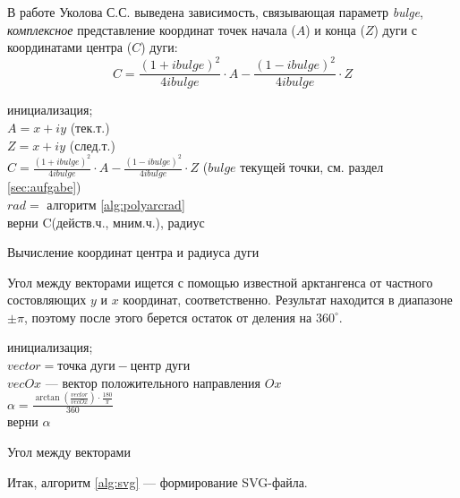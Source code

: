 В работе Уколова С.С. \cite{ukoloff} выведена зависимость, связывающая параметр \textit{bulge},  \textit{комплексное} представление координат точек начала ($A$) и конца ($Z$) дуги с координатами центра ($C$) дуги:
\begin{equation}
	C={\frac{(1+ibulge)^2}{4ibulge}}\cdot A-{\frac{(1-ibulge)^2}{4ibulge}}\cdot Z
	\label{F:arcenter}
\end{equation}

\begin{algorithm}[H]
	\SetAlgoLined
	инициализация;\\
	$A=x+iy$ (тек.т.)\\
	$Z=x+iy$ (след.т.)\\
	$C={\frac{(1+ibulge)^2}{4ibulge}}\cdot A-{\frac{(1-ibulge)^2}{4ibulge}}\cdot Z$ ($bulge$ текущей точки, см. раздел \ref{sec:aufgabe})\\
	$rad=$ алгоритм \ref{alg:polyarcrad}\\
	верни C(действ.ч., мним.ч.), радиус
	\caption{Вычисление координат центра и радиуса дуги}
	\label{alg:polyarc_center_rad}
\end{algorithm}

Угол между векторами ищется с помощью известной арктангенса от частного состовляющих $y$ и $x$ координат, соответственно. Результат находится в диапазоне $\pm\pi$, поэтому после этого берется остаток от деления на $360^\circ$.

\begin{algorithm}[H]
	\SetAlgoLined
	инициализация;\\
	$vector=\text{точка дуги}-\text{центр дуги}$\\
	$vecOx$ --- вектор положительного направления $Ox$\\
	$\alpha=\frac{\arctan(\frac{vector}{vecOx})\cdot\frac{180}{\pi}}{360}$\\
	верни $\alpha$
	\caption{Угол между векторами}
	\label{alg:angle_vectors}
\end{algorithm}

Итак, алгоритм \ref{alg:svg} --- формирование SVG-файла.

